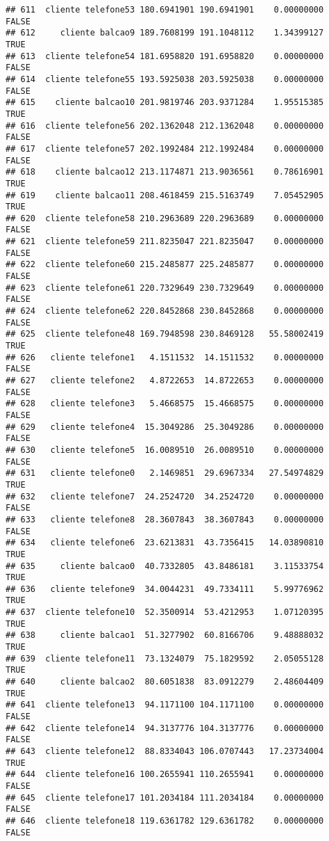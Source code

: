 \documentclass[
]{article}
\begin{document}
\begin{verbatim}
## 611  cliente telefone53 180.6941901 190.6941901    0.00000000    FALSE
## 612     cliente balcao9 189.7608199 191.1048112    1.34399127     TRUE
## 613  cliente telefone54 181.6958820 191.6958820    0.00000000    FALSE
## 614  cliente telefone55 193.5925038 203.5925038    0.00000000    FALSE
## 615    cliente balcao10 201.9819746 203.9371284    1.95515385     TRUE
## 616  cliente telefone56 202.1362048 212.1362048    0.00000000    FALSE
## 617  cliente telefone57 202.1992484 212.1992484    0.00000000    FALSE
## 618    cliente balcao12 213.1174871 213.9036561    0.78616901     TRUE
## 619    cliente balcao11 208.4618459 215.5163749    7.05452905     TRUE
## 620  cliente telefone58 210.2963689 220.2963689    0.00000000    FALSE
## 621  cliente telefone59 211.8235047 221.8235047    0.00000000    FALSE
## 622  cliente telefone60 215.2485877 225.2485877    0.00000000    FALSE
## 623  cliente telefone61 220.7329649 230.7329649    0.00000000    FALSE
## 624  cliente telefone62 220.8452868 230.8452868    0.00000000    FALSE
## 625  cliente telefone48 169.7948598 230.8469128   55.58002419     TRUE
## 626   cliente telefone1   4.1511532  14.1511532    0.00000000    FALSE
## 627   cliente telefone2   4.8722653  14.8722653    0.00000000    FALSE
## 628   cliente telefone3   5.4668575  15.4668575    0.00000000    FALSE
## 629   cliente telefone4  15.3049286  25.3049286    0.00000000    FALSE
## 630   cliente telefone5  16.0089510  26.0089510    0.00000000    FALSE
## 631   cliente telefone0   2.1469851  29.6967334   27.54974829     TRUE
## 632   cliente telefone7  24.2524720  34.2524720    0.00000000    FALSE
## 633   cliente telefone8  28.3607843  38.3607843    0.00000000    FALSE
## 634   cliente telefone6  23.6213831  43.7356415   14.03890810     TRUE
## 635     cliente balcao0  40.7332805  43.8486181    3.11533754     TRUE
## 636   cliente telefone9  34.0044231  49.7334111    5.99776962     TRUE
## 637  cliente telefone10  52.3500914  53.4212953    1.07120395     TRUE
## 638     cliente balcao1  51.3277902  60.8166706    9.48888032     TRUE
## 639  cliente telefone11  73.1324079  75.1829592    2.05055128     TRUE
## 640     cliente balcao2  80.6051838  83.0912279    2.48604409     TRUE
## 641  cliente telefone13  94.1171100 104.1171100    0.00000000    FALSE
## 642  cliente telefone14  94.3137776 104.3137776    0.00000000    FALSE
## 643  cliente telefone12  88.8334043 106.0707443   17.23734004     TRUE
## 644  cliente telefone16 100.2655941 110.2655941    0.00000000    FALSE
## 645  cliente telefone17 101.2034184 111.2034184    0.00000000    FALSE
## 646  cliente telefone18 119.6361782 129.6361782    0.00000000    FALSE

\end{verbatim}
\end{document}
